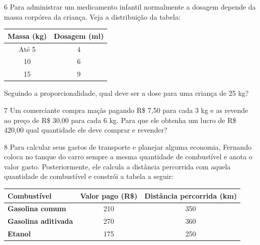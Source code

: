 \begin{escolha}
\begin{escolha}
\num{6} Para administrar um medicamento infantil normalmente a dosagem
depende da massa corpórea da criança. Veja a distribuição da tabela:

\begin{center}
\begin{tabular}{|c|c|}
\hline
\textbf{Massa (kg)} & \textbf{Dosagem (ml)} \\ \hline
Até 5 & 4 \\ \hline
10 & 6 \\ \hline
15 & 9 \\ \hline
\end{tabular}
\end{center}

Seguindo a proporcionalidade, qual deve ser a dose para uma criança de 25
kg?

\begin{boxpeq}
\end{boxpeq}

\num{7} Um comerciante compra maçãs pagando R\$ 7,50 para cada 3 kg e as
revende ao preço de R\$ 30,00 para cada 6 kg. Para que ele obtenha um
lucro de R\$ 420,00 qual quantidade ele deve comprar e revender?

\begin{boxpeq}
\end{boxpeq}

\num{8} Para calcular seus gastos de transporte e planejar alguma economia,
Fernando coloca no tanque do carro sempre a mesma quantidade de combustível 
e anota o valor gasto. Posteriormente, ele calcula a distância percorrida com
aquela quantidade de combustível e constrói a tabela a seguir:

\begin{tabular}{|l |c|c|}
\hline
\textbf{Combustível} & \cellcolor[HTML]{DAE8FC}\textbf{Valor pago (R\$)} & \cellcolor[HTML]{DAE8FC}\textbf{Distância percorrida (km)} \\ \hline
\textbf{Gasolina comum} & 210 & 350 \\ \hline
\textbf{Gasolina aditivada} & 270 & 360 \\ \hline
\textbf{Etanol} & 175 & 250 \\ \hline
\end{tabular}


\end{escolha}
\end{escolha}
